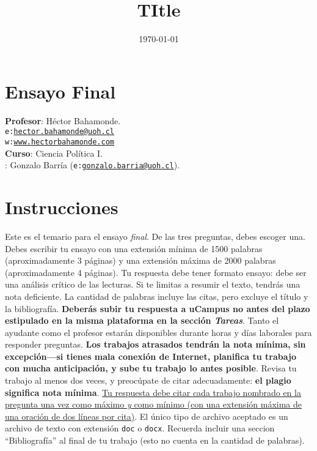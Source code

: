 \documentclass[onesided]{article}\usepackage[]{graphicx}\usepackage[]{color}
\title{TItle} %
\date{\today}
\begin{document}










\clearpage
\newpage
{}
\setcounter{page}{1}

\section{Ensayo Final}

{\bf Profesor}: H\'ector Bahamonde.\\
\texttt{e:}\href{mailto:hector.bahamonde@uoh.cl}{\texttt{hector.bahamonde@uoh.cl}}\\
\texttt{w:}\href{http://www.hectorbahamonde.com}{\texttt{www.hectorbahamonde.com}}\\
{\bf Curso}: Ciencia Pol\'itica I.\\
\hspace{-5mm}{\bf Ayudante}: Gonzalo Barr\'ia (\texttt{e:}\href{mailto:gonzalo.barria@uoh.cl}{\texttt{gonzalo.barria@uoh.cl}}).

\section*{Instrucciones}
Este es el temario para el ensayo \emph{final}. De las tres preguntas, debes escoger una. Debes escribir tu ensayo con una extensi\'on m\'inima de 1500 palabras (aproximadamente 3 p\'aginas) y una extensi\'on m\'axima de 2000 palabras (aproximadamente 4 p\'aginas). Tu respuesta debe tener formato ensayo: debe ser una an\'alisis cr\'itico de las lecturas. Si te limitas a resumir el texto, tendr\'as una nota deficiente. La cantidad de palabras incluye las citas, pero excluye el t\'itulo y la bibliograf\'ia. {\bf Deber\'as subir tu respuesta a uCampus no antes del plazo estipulado en la misma plataforma en la secci\'on \emph{Tareas}}. Tanto el ayudante como el profesor estar\'an disponibles durante horas y d\'ias laborales para responder preguntas. {\bf Los trabajos atrasados tendr\'an la nota m\'inima, sin excepci\'on---si tienes mala conexi\'on de Internet, planifica tu trabajo con mucha anticipaci\'on, y sube tu trabajo lo antes posible}. Revisa tu trabajo al menos dos veces, y preoc\'upate de citar adecuadamente: {\bf el plagio significa nota m\'inima}. \ul{Tu respuesta debe citar cada trabajo nombrado en la pregunta una vez como m\'aximo \emph{y} como m\'inimo (con una extensi\'on m\'axima de una oraci\'on de dos l\'ineas por cita)}. El \'unico tipo de archivo aceptado es un archivo de texto con extensi\'on \texttt{doc} o \texttt{docx}. Recuerda incluir una seccion ``Bibliograf\'ia'' al final de tu trabajo (esto no cuenta en la cantidad de palabras).
\end{document}
